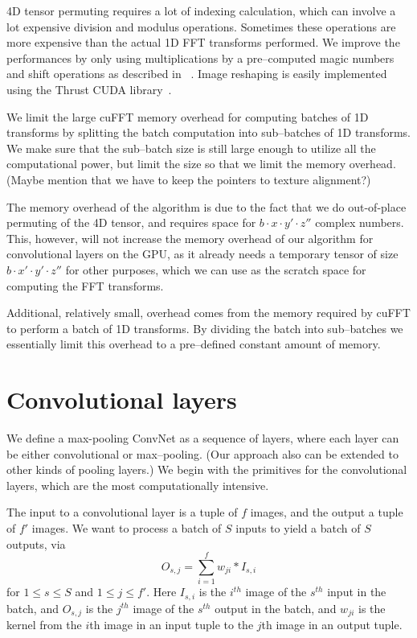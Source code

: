 \documentclass[conference]{./IEEEtran/IEEEtran}
\begin{document}
4D tensor permuting requires a lot of
  indexing calculation, which can involve a lot expensive division and
  modulus operations.  Sometimes these operations are more expensive
  than the actual 1D FFT transforms performed.  We improve the
  performances by only using multiplications by a pre--computed magic
  numbers and shift operations as described in
  ~\cite{warren2013hacker}.  Image reshaping is easily implemented
  using the Thrust CUDA library~\cite{bell2011thrust}.

  We limit the large cuFFT memory overhead for computing batches of 1D
  transforms by splitting the batch computation into sub--batches of
  1D transforms.  We make sure that the sub--batch size is still large
  enough to utilize all the computational power, but limit the size so
  that we limit the memory overhead.  (Maybe mention that we have to
  keep the pointers to texture alignment?)

  The memory overhead of the algorithm is due to the fact that we do
  out-of-place permuting of the 4D tensor, and requires space for $b
  \cdot x \cdot y' \cdot z''$ complex numbers.  This, however, will
  not increase the memory overhead of our algorithm for convolutional
  layers on the GPU, as it already needs a temporary tensor of size $b
  \cdot x' \cdot y' \cdot z''$ for other purposes, which we can use as
  the scratch space for computing the FFT transforms.

  Additional, relatively small, overhead comes from the memory
  required by cuFFT to perform a batch of 1D transforms.  By dividing
  the batch into sub--batches we essentially limit this overhead to a
  pre--defined constant amount of memory.


\section{Convolutional layers}
We define a max-pooling ConvNet as a sequence of layers, where each
layer can be either convolutional or max--pooling. (Our approach
also can be extended to other kinds of pooling layers.)  We begin with the
primitives for the convolutional layers, which are the most
computationally intensive.

  The input to a convolutional layer is a tuple of $f$ images, and the
  output a tuple of $f'$ images.  We want to process a batch of $S$
  inputs to yield a batch of $S$ outputs, via
  \[
  O_{s,j} = \sum_{i=1}^f w_{ji}\ast I_{s,i}
  \]
  for $1 \le s \le S$
  and $1 \le j \le f'$.  Here $I_{s,i}$ is the $i^{th}$ image of the
  $s^{th}$ input in the batch, and $O_{s,j}$ is the $j^{th}$ image of
  the $s^{th}$ output in the batch, and $w_{ji}$ is the kernel from
  the $i$th image in an input tuple to the $j$th image in an output
  tuple.
\end{document}
